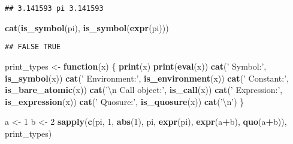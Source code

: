 \documentclass[]{book}
\newenvironment{Shaded}{\begin{snugshade}}{\end{snugshade}}
\newcommand{\KeywordTok}[1]{\textcolor[rgb]{0.13,0.29,0.53}{\textbf{#1}}}
\newcommand{\DecValTok}[1]{\textcolor[rgb]{0.00,0.00,0.81}{#1}}
\newcommand{\CharTok}[1]{\textcolor[rgb]{0.31,0.60,0.02}{#1}}
\newcommand{\StringTok}[1]{\textcolor[rgb]{0.31,0.60,0.02}{#1}}
\newcommand{\ControlFlowTok}[1]{\textcolor[rgb]{0.13,0.29,0.53}{\textbf{#1}}}
\newcommand{\OperatorTok}[1]{\textcolor[rgb]{0.81,0.36,0.00}{\textbf{#1}}}
\newcommand{\NormalTok}[1]{#1}
\begin{document}
\begin{verbatim}
## 3.141593 pi 3.141593
\end{verbatim}

\begin{Shaded}
\begin{Highlighting}[]
\KeywordTok{cat}\NormalTok{(}\KeywordTok{is_symbol}\NormalTok{(pi), }\KeywordTok{is_symbol}\NormalTok{(}\KeywordTok{expr}\NormalTok{(pi)))}
\end{Highlighting}
\end{Shaded}

\begin{verbatim}
## FALSE TRUE
\end{verbatim}

\begin{Shaded}
\begin{Highlighting}[]
\NormalTok{print_types <-}\StringTok{ }\ControlFlowTok{function}\NormalTok{(x) \{}
  \KeywordTok{print}\NormalTok{(x)}
  \KeywordTok{print}\NormalTok{(}\KeywordTok{eval}\NormalTok{(x))}
  \KeywordTok{cat}\NormalTok{(}\StringTok{'  Symbol:'}\NormalTok{, }\KeywordTok{is_symbol}\NormalTok{(x))}
  \KeywordTok{cat}\NormalTok{(}\StringTok{' Environment:'}\NormalTok{, }\KeywordTok{is_environment}\NormalTok{(x))}
  \KeywordTok{cat}\NormalTok{(}\StringTok{' Constant:'}\NormalTok{, }\KeywordTok{is_bare_atomic}\NormalTok{(x))}
  \KeywordTok{cat}\NormalTok{(}\StringTok{'}\CharTok{\textbackslash{}n}\StringTok{  Call object:'}\NormalTok{, }\KeywordTok{is_call}\NormalTok{(x))}
  \KeywordTok{cat}\NormalTok{(}\StringTok{' Expression:'}\NormalTok{, }\KeywordTok{is_expression}\NormalTok{(x))}
  \KeywordTok{cat}\NormalTok{(}\StringTok{' Quosure:'}\NormalTok{, }\KeywordTok{is_quosure}\NormalTok{(x))}
  \KeywordTok{cat}\NormalTok{(}\StringTok{'}\CharTok{\textbackslash{}n}\StringTok{'}\NormalTok{)}
\NormalTok{\}}
\end{Highlighting}
\end{Shaded}

\begin{Shaded}
\begin{Highlighting}[]
\NormalTok{a <-}\StringTok{ }\DecValTok{1}
\NormalTok{b <-}\StringTok{ }\DecValTok{2}
\KeywordTok{sapply}\NormalTok{(}\KeywordTok{c}\NormalTok{(pi, }\DecValTok{1}\NormalTok{, }\KeywordTok{abs}\NormalTok{(}\DecValTok{1}\NormalTok{), pi, }\KeywordTok{expr}\NormalTok{(pi), }\KeywordTok{expr}\NormalTok{(a}\OperatorTok{+}\NormalTok{b), }\KeywordTok{quo}\NormalTok{(a}\OperatorTok{+}\NormalTok{b)),}
\NormalTok{       print_types)}
\end{Highlighting}
\end{Shaded}
\end{document}

